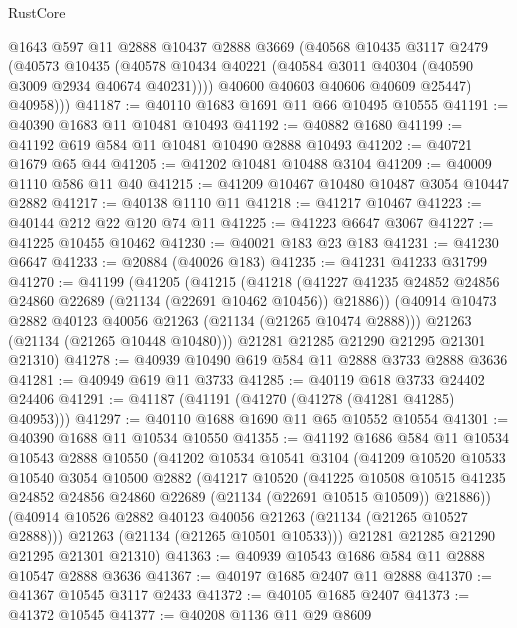 \begin{lexlean}{RustCore}
\begin{coremodule}
          @1643
          @597
          @11
          @2888
          @10437
          @2888
          @3669
          (@40568
            @10435
            @3117
            @2479
            (@40573
              @10435
              (@40578 @10434 @40221 (@40584 @3011 @40304 (@40590 @3009 @2934 @40674 @40231))))
            @40600
            @40603
            @40606
            @40609
            @25447)
          @40958)))
@41187 := @40110 @1683 @1691 @11 @66 @10495 @10555
@41191 := @40390 @1683 @11 @10481 @10493
@41192 := @40882 @1680
@41199 := @41192 @619 @584 @11 @10481 @10490 @2888 @10493
@41202 := @40721 @1679 @65 @44
@41205 := @41202 @10481 @10488 @3104
@41209 := @40009 @1110 @586 @11 @40
@41215 := @41209 @10467 @10480 @10487 @3054 @10447 @2882
@41217 := @40138 @1110 @11
@41218 := @41217 @10467
@41223 := @40144 @212 @22 @120 @74 @11
@41225 := @41223 @6647 @3067
@41227 := @41225 @10455 @10462
@41230 := @40021 @183 @23 @183
@41231 := @41230 @6647
@41233 := @20884 (@40026 @183)
@41235 := @41231 @41233 @31799
@41270 := @41199
    (@41205
      (@41215
        (@41218 (@41227 @41235 @24852 @24856 @24860 @22689 (@21134 (@22691 @10462 @10456)) @21886))
        (@40914 @10473 @2882 @40123 @40056 @21263 (@21134 (@21265 @10474 @2888)))
        @21263
        (@21134 (@21265 @10448 @10480)))
      @21281
      @21285
      @21290
      @21295
      @21301
      @21310)
@41278 := @40939 @10490 @619 @584 @11 @2888 @3733 @2888 @3636
@41281 := @40949 @619 @11 @3733
@41285 := @40119 @618 @3733 @24402 @24406
@41291 := @41187 (@41191 (@41270 (@41278 (@41281 @41285) @40953)))
@41297 := @40110 @1688 @1690 @11 @65 @10552 @10554
@41301 := @40390 @1688 @11 @10534 @10550
@41355 := @41192
    @1686
    @584
    @11
    @10534
    @10543
    @2888
    @10550
    (@41202
      @10534
      @10541
      @3104
      (@41209
        @10520
        @10533
        @10540
        @3054
        @10500
        @2882
        (@41217
          @10520
          (@41225
            @10508
            @10515
            @41235
            @24852
            @24856
            @24860
            @22689
            (@21134 (@22691 @10515 @10509))
            @21886))
        (@40914 @10526 @2882 @40123 @40056 @21263 (@21134 (@21265 @10527 @2888)))
        @21263
        (@21134 (@21265 @10501 @10533)))
      @21281
      @21285
      @21290
      @21295
      @21301
      @21310)
@41363 := @40939 @10543 @1686 @584 @11 @2888 @10547 @2888 @3636
@41367 := @40197 @1685 @2407 @11 @2888
@41370 := @41367 @10545 @3117 @2433
@41372 := @40105 @1685 @2407
@41373 := @41372 @10545
@41377 := @40208 @1136 @11 @29 @8609

\end{coremodule}
\end{lexlean}
